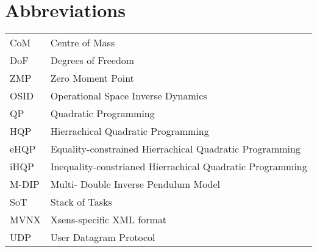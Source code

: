 \documentclass{thesisreport}
\begin{document}
\newpage

\section*{Abbreviations}

\begin{tabular}{p{3cm}p{15cm}}
CoM & Centre of Mass \\
DoF & Degrees of Freedom \\
ZMP & Zero Moment Point \\
OSID & Operational Space Inverse Dynamics \\
QP & Quadratic Programming \\
HQP & Hierrachical Quadratic Programming \\
eHQP & Equality-constrained Hierrachical Quadratic Programming \\
iHQP & Inequality-constrianed Hierrachical Quadratic Programming \\
M-DIP & Multi- Double Inverse Pendulum Model \\
SoT & Stack of Tasks \\
MVNX & Xsens-specific XML format \\
UDP & User Datagram Protocol \\

\end{tabular}

\newpage

\tableofcontents

\listoffigures
 
\listoftables
 



\leavevmode\thispagestyle{empty}\newpage



\leavevmode\thispagestyle{empty}\newpage


\leavevmode\thispagestyle{empty}\newpage


\leavevmode\thispagestyle{empty}\newpage


\leavevmode\thispagestyle{empty}\newpage


\leavevmode\thispagestyle{empty}\newpage


 
 
 
 \appendix	
 
 
 
 
 
 
 
 
\end{document}
